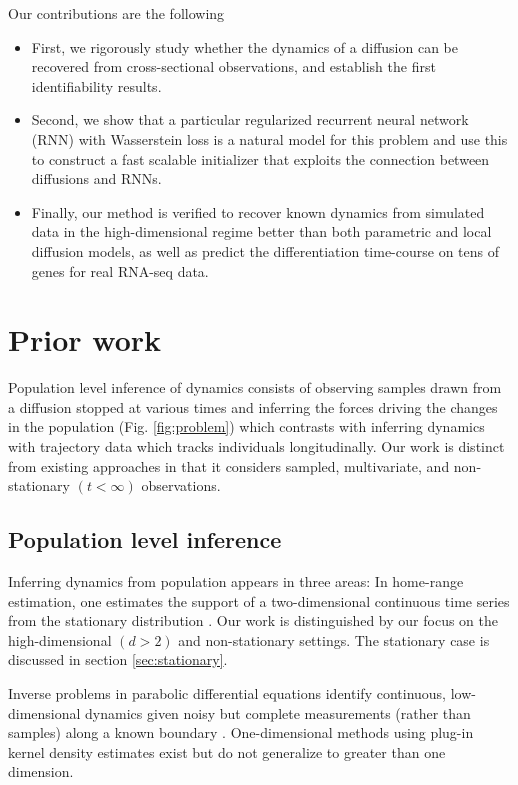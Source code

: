 \documentclass{article}
\begin{document}
Our contributions are the following
\begin{itemize}
\item First, we rigorously study whether the dynamics of a diffusion can be recovered from cross-sectional observations, and establish the first identifiability results.
\item Second, we show that a particular regularized recurrent neural network (RNN) with Wasserstein loss is a natural model for this problem and use this to construct a fast scalable initializer that exploits the connection between diffusions and RNNs.
\item Finally, our method is verified to recover known dynamics from simulated data in the high-dimensional regime better than both parametric and local diffusion models, as well as predict the differentiation time-course on tens of genes for real RNA-seq data.
\end{itemize}

\section{Prior work}

Population level inference of dynamics consists of observing samples drawn from a diffusion stopped at various times and inferring the forces driving the changes in the population (Fig. \ref{fig:problem}) which contrasts with inferring dynamics with trajectory data which tracks individuals longitudinally. Our work is distinct from existing approaches in that it considers sampled, multivariate, and non-stationary $(t < \infty)$ observations.

\subsection{Population level inference}

Inferring dynamics from population appears in three areas: In home-range estimation, one estimates the support of a two-dimensional continuous time series from the stationary distribution \citep{fleming2015rigorous}. Our work is distinguished by our focus on the high-dimensional $(d>2)$ and non-stationary settings. The stationary case is discussed in section \ref{sec:stationary}.

Inverse problems in parabolic differential equations identify continuous, low-dimensional dynamics given noisy but complete measurements (rather than samples) along a known boundary \citep{tarantola2005inverse}. One-dimensional methods using plug-in kernel density estimates exist \citep{lund2014nonparametric} but do not generalize to greater than one dimension.
\end{document}
